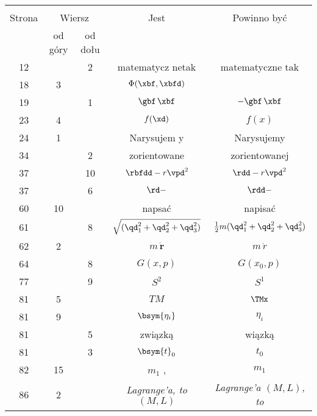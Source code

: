 \documentclass[a4paper,11pt]{article}
\begin{document}
\begin{center}
  \begin{tabular}{|c|c|c|c|c|}
    \hline
    & \multicolumn{2}{c|}{} & & \\
    Strona & \multicolumn{2}{c|}{Wiersz} & Jest
                              & Powinno być \\ \cline{2-3}
    & od góry & od dołu & & \\
    \hline
    12  & &  2 & matematycz netak & matematyczne tak \\
    18  &  3 & & $\Phi( \xbf, \xbfd )$
           & %
    \\
    19  & &  1 & $\gbf\, \xbf$ & $- \gbf\, \xbf$ \\
    23  &  4 & & $f( \xd )$ & $f( x )$ \\
    24  &  1 & & Narysujem y & Narysujemy \\
    34  & &  2 & zorientowane & zorientowanej \\
    37  & & 10 & $\rbfdd - r \vpd^{ 2 }$ & $\rdd - r \vpd^{ 2 }$ \\
    37  & &  6 & $\rd -$ & $\rdd -$ \\
    60  & 10 & & napsać & napisać \\
    61  & &  8 & $\sqrt{ ( \qd_{ 1 }^{ 2 } + \qd_{ 2 }^{ 2 }
                 + \qd_{ 3 }^{ 2 } ) }$
           & $\frac{ 1 }{ 2 } m ( \qd_{ 1 }^{ 2 } + \qd_{ 2 }^{ 2 }
             + \qd_{ 3 }^{ 2 } )$ \\
    62  &  2 & & $m\, \dot{ \mathbf{r} }$ & $m\, \dot{ r }$ \\
    64  & &  8 & $G( x, p )$ & $G( x_{ 0 }, p )$ \\
    77  & &  9 & $S^{ 2 }$ & $S^{ 1 }$ \\
    81  &  5 & & $TM$ & $\TMx$ \\
    81  &  9 & & $\bsym{ \eta_{ i } }$ & $\eta_{ i }$ \\
    81  & &  5 & związką & wiązką \\
    81  & &  3 & $\bsym{t}_{ 0 }$ & $t_{ 0 }$ \\
    82  & 15 & & $m_{ 1 }${  }, & $m_{ 1 }$ \\
    86  &  2 & & \emph{Lagrange'a, to $( M, L )$}
           & \emph{Lagrange'a $( M, L )$, to} \\

\end{tabular}
\end{center}
\end{document}
